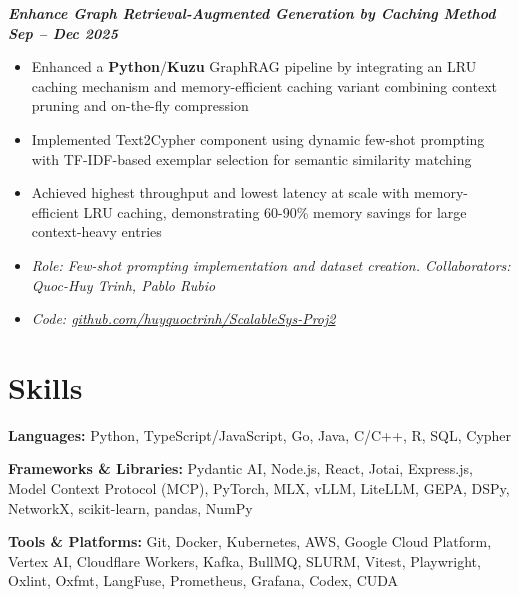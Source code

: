\documentclass[11pt,a4paper]{article}
\newcommand{\projectheader}[2]{%
    \Needspace{7\baselineskip}%
    \noindent\textbf{\textit{#1}} \hfill \textbf{\textit{#2}}%
}
\begin{document}
\vspace{8pt}

\projectheader{Enhance Graph Retrieval-Augmented Generation by Caching Method}{Sep -- Dec 2025}
\begin{itemize}
    \item Enhanced a \textbf{Python}/\textbf{Kuzu} GraphRAG pipeline by integrating an LRU caching mechanism and memory-efficient caching variant combining context pruning and on-the-fly compression
    \item Implemented Text2Cypher component using dynamic few-shot prompting with TF-IDF-based exemplar selection for semantic similarity matching
    \item Achieved highest throughput and lowest latency at scale with memory-efficient LRU caching, demonstrating 60-90\% memory savings for large context-heavy entries
    \item \textit{Role: Few-shot prompting implementation and dataset creation. Collaborators: Quoc-Huy Trinh, Pablo Rubio}
    \item \textit{Code: \href{https://github.com/huyquoctrinh/ScalableSys-Proj2}{github.com/huyquoctrinh/ScalableSys-Proj2}}
\end{itemize}

\vspace{8pt}

\section{Skills}

\noindent\textbf{Languages:} Python, TypeScript/JavaScript, Go, Java, C/C++, R, SQL, Cypher

\vspace{4pt}

\noindent\textbf{Frameworks \& Libraries:} Pydantic AI, Node.js, React, Jotai, Express.js, Model Context Protocol (MCP), PyTorch, MLX, vLLM, LiteLLM, GEPA, DSPy, NetworkX, scikit-learn, pandas, NumPy

\vspace{4pt}

\noindent\textbf{Tools \& Platforms:} Git, Docker, Kubernetes, AWS, Google Cloud Platform, Vertex AI, Cloudflare Workers, Kafka, BullMQ, SLURM, Vitest, Playwright, Oxlint, Oxfmt, LangFuse, Prometheus, Grafana, Codex, CUDA
\end{document}
